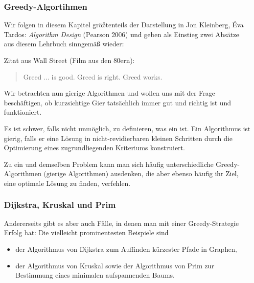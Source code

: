 \documentclass[smaller]{beamer}
\begin{document}
\begin{frame}
 \frametitle{Greedy-Algortihmen}
 Wir folgen in diesem Kapitel größtenteils der Darstellung in Jon Kleinberg, Éva Tardos: \textit{Algorithm Design} (Pearson 2006) und geben als Einstieg zwei Absätze aus diesem Lehrbuch sinngemäß wieder: \\ \vspace*{0.2cm}


Zitat aus {\glqq}Wall Street{\grqq} (Film aus den 80ern):
\begin{quote}
\alert{Greed $\ldots$ is good. Greed is right. Greed works.}
\end{quote}

Wir betrachten nun \alert{{\glqq}gierige Algorithmen{\grqq}} und wollen uns mit der Frage beschäftigen, ob kurzsichtige Gier tatsächlich immer gut und richtig ist und funktioniert. \\ \vspace*{0.2cm}

Es ist schwer, falls nicht unmöglich, zu definieren, was ein  ist. Ein Algorithmus ist gierig, 
falls er eine Lösung in \alert{nicht-revidierbaren} kleinen Schritten durch die Optimierung eines zugrundliegenden Kriteriums konstruiert. \\ \vspace*{0.2cm}

Zu ein und demselben Problem kann man sich häufig unterschiedliche Greedy-Algorithmen ({\glqq}gierige Algorithmen{\grqq}) ausdenken, \alert{die aber ebenso häufig ihr Ziel, eine optimale Lösung zu finden, verfehlen.}
\end{frame}

\begin{frame}
 \frametitle{Dijkstra, Kruskal und Prim}
 Andererseits gibt es aber auch Fälle, in denen man mit einer Greedy-Strategie Erfolg hat: Die vielleicht prominentesten Beispiele sind 
\begin{itemize}
\item der \alert{Algorithmus von Dijkstra} zum Auffinden kürzester Pfade in Graphen,
\item der \alert{Algorithmus von Kruskal} sowie der \alert{Algorithmus von Prim} zur Bestimmung eines minimalen aufspannenden Baums.
\end{itemize}
\end{frame}
\end{document}
